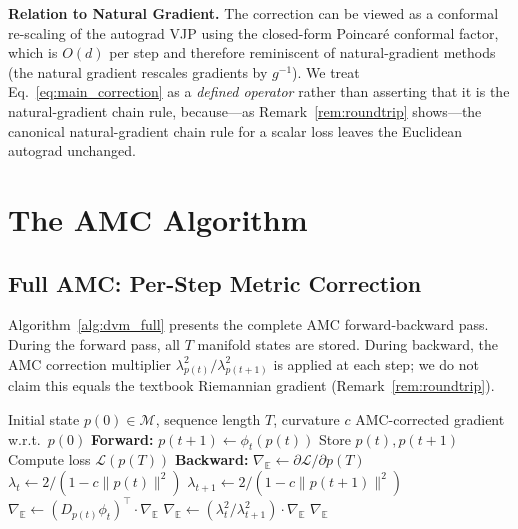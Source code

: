\documentclass[a4paper,fleqn]{cas-dc}
\begin{document}
\textbf{Relation to Natural Gradient.} The correction can be viewed as a conformal re-scaling of the autograd VJP using the closed-form Poincar\'e conformal factor, which is $O(d)$ per step and therefore reminiscent of natural-gradient methods~\citep{Amari98} (the natural gradient rescales gradients by $g^{-1}$). We treat Eq.~\eqref{eq:main_correction} as a \emph{defined operator} rather than asserting that it is the natural-gradient chain rule, because---as Remark~\ref{rem:roundtrip} shows---the canonical natural-gradient chain rule for a scalar loss leaves the Euclidean autograd unchanged.

\section{The AMC Algorithm}
\label{sec:method}

\subsection{Full AMC: Per-Step Metric Correction}

Algorithm~\ref{alg:dvm_full} presents the complete AMC forward-backward pass. During the forward pass, all $T$ manifold states are stored. During backward, the AMC correction multiplier $\lambda_{p(t)}^2 / \lambda_{p(t+1)}^2$ is applied at each step; we do not claim this equals the textbook Riemannian gradient (Remark~\ref{rem:roundtrip}).

\begin{algorithm}[htbp]
\footnotesize
\caption{Full AMC with Per-Step Riemannian Correction}
\label{alg:dvm_full}
\begin{algorithmic}[1]
\Require Initial state $p(0) \in \mathcal{M}$, sequence length $T$, curvature $c$
\Ensure AMC-corrected gradient w.r.t.\ $p(0)$
\State \textbf{Forward:}
    \State $p(t+1) \leftarrow \phi_t(p(t))$ 
    \State Store $p(t), p(t+1)$
\EndFor
\State Compute loss $\mathcal{L}(p(T))$
\State \textbf{Backward:}
\State $\nabla_{\mathbb{E}} \leftarrow \partial\mathcal{L}/\partial p(T)$ 
    \State $\lambda_t \leftarrow 2/(1 - c\|p(t)\|^2)$
    \State $\lambda_{t+1} \leftarrow 2/(1 - c\|p(t+1)\|^2)$
    \State $\nabla_{\mathbb{E}} \leftarrow (D_{p(t)}\phi_t)^\top \cdot \nabla_{\mathbb{E}}$ 
    \State $\nabla_{\mathbb{E}} \leftarrow (\lambda_t^2 / \lambda_{t+1}^2) \cdot \nabla_{\mathbb{E}}$ 
\EndFor
\State \Return $\nabla_{\mathbb{E}}$
\end{algorithmic}
\end{algorithm}
\end{document}
